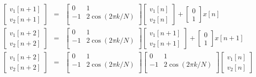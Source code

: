 
\begin{eqnarray}
\left[
\begin{array}{c}
v_{1}[n+1] \\
v_{2}[n+1]
\end{array} 
\right]
& = &
\left[
\begin{array}{cc}
0 & 1 \\
-1 & 2\cos(2\pi k/N) \\
\end{array}
\right]
\left[
\begin{array}{c}
v_{1}[n] \\
v_{2}[n]
\end{array}
\right]
+
\left[
\begin{array}{cc}
0\\
1
\end{array}
\right]
x[n]
\\
\left[
\begin{array}{c}
v_{1}[n+2] \\
v_{2}[n+2]
\end{array} 
\right]
 & = &
\left[
\begin{array}{cc}
0 & 1 \\
-1 & 2\cos(2\pi k/N) \\
\end{array}
\right]
\left[
\begin{array}{c}
v_{1}[n+1] \\
v_{2}[n+1]
\end{array}
\right]
+
\left[
\begin{array}{cc}
0\\
1
\end{array}
\right]
x[n+1] \\
\left[
\begin{array}{c}
v_{1}[n+2] \\
v_{2}[n+2]
\end{array} 
\right]
 & = &
\left[
\begin{array}{cc}
0 & 1 \\
-1 &2\cos(2\pi k/N) \\
\end{array}
\right]
\left[
\begin{array}{cc}
0 & 1 \\
-1 & 2\cos(2\pi k/N) \\
\end{array}
\right]
\left[
\begin{array}{c}
v_{1}[n] \\
v_{2}[n]
\end{array}
\right]

\end{eqnarray}
